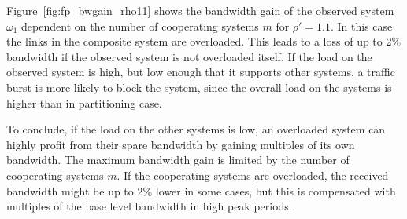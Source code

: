 Figure~\ref{fig:fp_bwgain_rho11} shows the bandwidth gain of the observed system $\omega_1$ dependent on the number of cooperating systems $m$ for $\rho'=1.1$.
In this case the links in the composite system are overloaded.
This leads to a loss of up to 2\% bandwidth if the observed system is not overloaded itself.
If the load on the observed system is high, but low enough that it supports other systems, a traffic burst is more likely to block the system, since the overall load on the systems is higher than in partitioning case.

To conclude, if the load on the other systems is low, an overloaded system can highly profit from their spare bandwidth by gaining multiples of its own bandwidth. The maximum bandwidth gain is limited by the number of cooperating systems $m$.
If the cooperating systems are overloaded, the received bandwidth might be up to 2\% lower in some cases, but this is compensated with multiples of the base level bandwidth in high peak periods.



